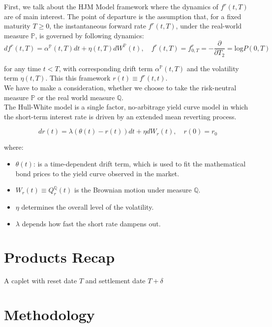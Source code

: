     First, we talk about the HJM Model framework where the dynamics of $f^{r}(t, T)$ are of main interest. The point of departure is the assumption that, for a fixed maturity $T \geq 0$, the instantaneous forward rate $f^{r}(t, T)$, under the real-world measure $\mathbb{P}$, is governed by following dynamics: 
    \begin{equation}
        df^{r}(t,T) = \alpha^{\mathbb{P}}(t,T)dt + \eta(t,T)dW^{\mathbb{P}}(t), \quad f^{r}(t, T) = f^{r}_{0,T}  = - \frac{\partial}{\partial T_2} = \text{log} P (0,T)
    \end{equation}
    
    for any time  $t < T$, with corresponding drift term $\alpha^{\mathbb{P}}(t,T)$ and the volatility term 
    $\eta(t,T)$. This this framework $r(t) \equiv f^{r}(t,t)$. \\ 

    We have to make a consideration, whether we choose to take the risk-neutral measure $\mathbb{P}$ or the real world measure $\mathbb{Q}$. \\

    The Hull-White model is a single factor, no-arbitrage yield curve model in which the short-term interest rate is driven by an extended mean reverting process. 

    \begin{equation}
        dr(t) = \lambda (\theta (t) - r(t))dt + \eta dW_r(t), \quad r(0) = r_0
    \end{equation}

    where: 
    \begin{itemize}
        \item $\theta(t)$: is a time-dependent drift term, which is used to fit the mathematical bond prices to the yield curve observed in the market. 
        \item $W_r(t) \equiv Q^{\mathbb{Q}}_r(t)$ is the Brownian motion under measure $\mathbb{Q}$.
        \item $\eta$ determines the overall level of the volatility. 
        \item $\lambda$ depends how fast the short rate dampens out. 
    \end{itemize}
\section{Products Recap}

A caplet with reset date $T$ and settlement date $T +\delta$

\section{Methodology}

